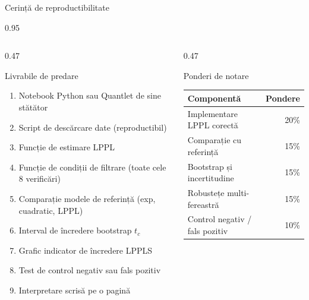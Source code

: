 \documentclass[9pt, aspectratio=169, t]{beamer}
\begin{document}
\begin{frame}{Cerință de reproductibilitate}
    \begin{cminipage}{0.95\textwidth}
    {\scriptsize
    \begin{columns}[T]
        \begin{column}{0.47\textwidth}
            \begin{block}{Livrabile de predare}
                \begin{enumerate}\setlength{\itemsep}{0pt}
                    \item Notebook Python sau Quantlet de sine stătător
                    \item Script de descărcare date (reproductibil)
                    \item Funcție de estimare LPPL
                    \item Funcție de condiții de filtrare (toate cele 8 verificări)
                    \item Comparație modele de referință (exp, cuadratic, LPPL)
                    \item Interval de încredere bootstrap $t_c$
                    \item Grafic indicator de încredere LPPLS
                    \item Test de control negativ sau fals pozitiv
                    \item Interpretare scrisă pe o pagină
                \end{enumerate}
            \end{block}
        \end{column}
        \begin{column}{0.47\textwidth}
            \begin{alertblock}{Ponderi de notare}
                {\scriptsize
                \begin{center}
                    \begin{tabular}{lr}
                        \toprule
                        \textbf{Componentă} & \textbf{Pondere} \\
                        \midrule
                        Implementare LPPL corectă & 20\% \\
                        Comparație cu referință & 15\% \\
                        Bootstrap și incertitudine & 15\% \\
                        Robustețe multi-fereastră & 15\% \\
                        Control negativ / fals pozitiv & 10\% \\

\end{tabular}
\end{center}}
\end{alertblock}
\end{column}
\end{columns}}
\end{cminipage}
\end{frame}
\end{document}
